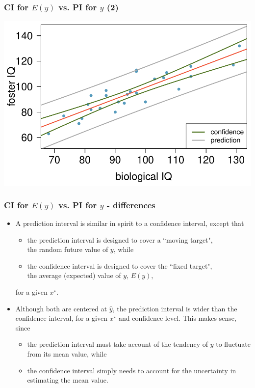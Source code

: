 \documentclass[slidestop,compress,mathserif,12pt,t,professionalfonts,xcolor=table]{beamer}
\begin{document}

\begin{frame}
\frametitle{CI for $E(y)$ vs. PI for $y$ (2)}

\begin{center}
\includegraphics[width=\textwidth]{figures/twins/twins_IQ_cint_pint}
\end{center}

\end{frame}



\begin{frame}
\frametitle{CI for $E(y)$ vs. PI for $y$ - differences}

\begin{itemize}

\item A prediction interval is similar in spirit to a confidence interval, except that 
\pause
\begin{itemize}
\item the prediction interval is designed to cover a ``moving target", \\
the random future value of $y$, while
\pause
\item the confidence interval is designed to cover the ``fixed target", \\
the average (expected) value of $y$, $E(y)$,
\end{itemize}
for a given $x^\star$.

\pause

\item Although both are centered at $\hat{y}$, the prediction interval is wider than the confidence interval, for a given $x^\star$ and confidence level. This makes sense, since
\pause
\begin{itemize}
\item the prediction interval must take account of the tendency of $y$ to fluctuate from its mean value, while 
\pause
\item the confidence interval simply needs to account for the uncertainty in estimating the mean value.
\end{itemize}

\end{itemize}

\end{frame}
\end{document}
